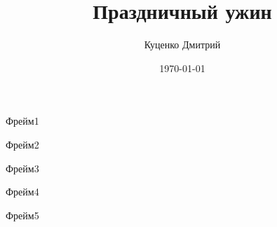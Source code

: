 \documentclass[t]{beamer}
\author{Куценко Дмитрий}
\title{Праздничный ужин}
\date{\today}
\begin{document}
\begin{frame}[plain]
    \titlepage
\end{frame}

\begin{frame}
    Фрейм1
\end{frame}

\begin{frame}
    Фрейм2
\end{frame}

\begin{frame}
    Фрейм3
\end{frame}

\begin{frame}
    Фрейм4
\end{frame}

\begin{frame}
    Фрейм5
\end{frame}
\end{document}
